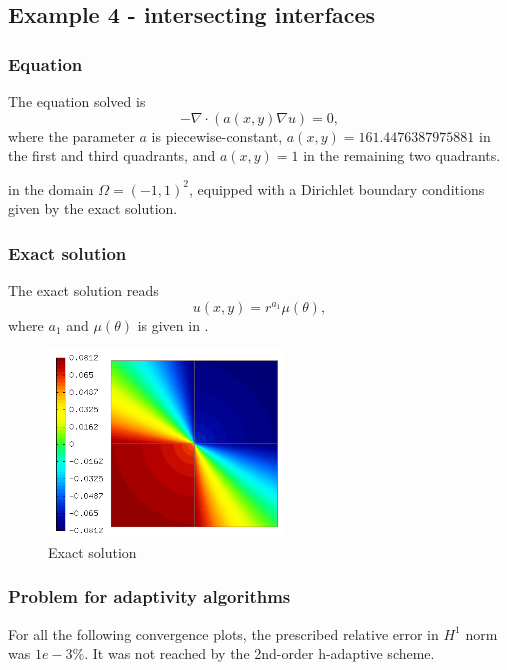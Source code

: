 	\newpage
	\subsection{Example 4 - intersecting interfaces}
		\subsubsection{Equation}
		The equation solved is
		\begin{equation}
			-\nabla \cdot (a(x,y) \nabla u) = 0,
		\end{equation}
		where the parameter $a$ is piecewise-constant,
		$a(x,y) = 161.4476387975881$ in the first and third quadrants,
		and $a(x,y) = 1$ in the remaining two quadrants.

		in the domain $\Omega = (-1, 1)^2$, equipped with a Dirichlet
		boundary conditions given by the exact solution.

		\subsubsection{Exact solution}
		The exact solution reads
		\begin{equation}
			u(x,y) = r^{a_1} \mu (\theta),
		\end{equation}
		where $a_1$ and $\mu (\theta)$ is given in \cite{mitchell-1}.
		\begin{figure}[H]
			\centering
			\includegraphics[height=5cm]{img/exact-kellog.png}
			\caption{Exact solution}
			\label{fig:exact-kellog}
		\end{figure}
		
		\subsubsection{Problem for adaptivity algorithms}
		
			For all the following convergence plots, the prescribed relative error in $H^1$ norm was $1e-3\%$. It was not reached by the 2nd-order h-adaptive scheme.
		
